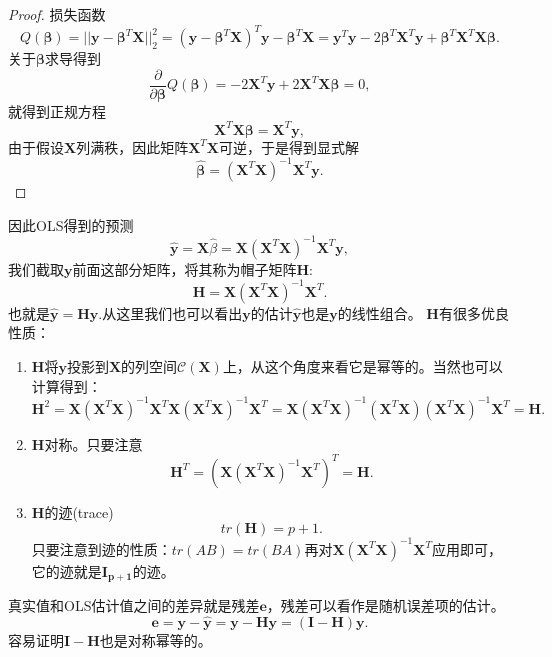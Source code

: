 \documentclass[lang=cn,10pt]{elegantbook}
\begin{document}
    \begin{proof}
        损失函数
        \[Q(\mathbf{\beta})=||\mathbf{y}-\mathbf{\beta}^T\mathbf{X}||_2^2=(\mathbf{y}-\mathbf{\beta}^T\mathbf{X})^T\mathbf{y}-\mathbf{\beta}^T\mathbf{X}=\mathbf{y}^T\mathbf{y}-2\mathbf{\beta}^T\mathbf{X}^T\mathbf{y}+\mathbf{\beta}^T\mathbf{X}^T\mathbf{X}\mathbf{\beta}.\]
        关于\(\mathbf{\beta}\)求导得到
        \[\frac{\partial}{\partial \mathbf{\beta}}Q(\mathbf{\beta})=-2\mathbf{X}^T\mathbf{y}+2\mathbf{X}^T\mathbf{X}\mathbf{\beta}=0,\]
        就得到正规方程
        \[\mathbf{X}^T\mathbf{X}\mathbf{\beta}=\mathbf{X}^T\mathbf{y},\]
        由于假设\(\mathbf{X}\)列满秩，因此矩阵\(\mathbf{X}^T\mathbf{X}\)可逆，于是得到显式解
        \[\hat{\mathbf{\beta}}=(\mathbf{X}^T\mathbf{X})^{-1}\mathbf{X}^T\mathbf{y}.\]
    \end{proof}
    因此OLS得到的预测
    \[\hat{\mathbf{y}}=\mathbf{X}\hat{\beta}=\mathbf{X}(\mathbf{X}^T\mathbf{X})^{-1}\mathbf{X}^T\mathbf{y},\]
    我们截取\(\mathbf{y}\)前面这部分矩阵，将其称为帽子矩阵\(\mathbf{H}\):
    \[\mathbf{H}=\mathbf{X}(\mathbf{X}^T\mathbf{X})^{-1}\mathbf{X}^T.\]
    也就是\(\hat{\mathbf{y}}=\mathbf{H}\mathbf{y}\).从这里我们也可以看出\(\mathbf{y}\)的估计\(\hat{\mathbf{y}}\)也是\(\mathbf{y}\)的线性组合。
    \(\mathbf{H}\)有很多优良性质：
    \begin{property}
        \begin{enumerate}
            \item \(\mathbf{H}\)将\(\mathbf{y}\)投影到\(\mathbf{X}\)的列空间\(\mathcal{C}(\mathbf{X})\)上，从这个角度来看它是幂等的。当然也可以计算得到：\[\mathbf{H}^2=\mathbf{X}(\mathbf{X}^T\mathbf{X})^{-1}\mathbf{X}^T\mathbf{X}(\mathbf{X}^T\mathbf{X})^{-1}\mathbf{X}^T=\mathbf{X}(\mathbf{X}^T\mathbf{X})^{-1}(\mathbf{X}^T\mathbf{X})(\mathbf{X}^T\mathbf{X})^{-1}\mathbf{X}^T=\mathbf{H}.\]
            \item \(\mathbf{H}\)对称。只要注意\[\mathbf{H}^T=(\mathbf{X}(\mathbf{X}^T\mathbf{X})^{-1}\mathbf{X}^T)^T=\mathbf{H}.\]
            \item \(\mathbf{H}\)的迹(trace)\[tr(\mathbf{H})=p+1.\]只要注意到迹的性质：\(tr(AB)=tr(BA)\)再对\(\mathbf{X}(\mathbf{X}^T\mathbf{X})^{-1}\mathbf{X}^T\)应用即可，它的迹就是\(\mathbf{I_{p+1}}\)的迹。
        \end{enumerate}
    \end{property}
    真实值和OLS估计值之间的差异就是残差\(\mathbf{e}\)，残差可以看作是随机误差项的估计。
    \[\mathbf{e}=\mathbf{y}-\hat{\mathbf{y}}=\mathbf{y}-\mathbf{H}\mathbf{y}=(\mathbf{I}-\mathbf{H})\mathbf{y}.\]
    容易证明\(\mathbf{I-H}\)也是对称幂等的。
\end{document}
